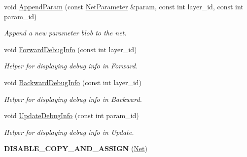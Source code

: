 \begin{DoxyCompactItemize}
\mbox{\label{classcaffe_1_1_net_a1fce7e829c10750543f3a79819d49393}} 
void \mbox{\hyperlink{classcaffe_1_1_net_a1fce7e829c10750543f3a79819d49393}{Append\+Param}} (const \mbox{\hyperlink{classcaffe_1_1_net_parameter}{Net\+Parameter}} \&param, const int layer\+\_\+id, const int param\+\_\+id)
\begin{DoxyCompactList}\small\item\em Append a new parameter blob to the net. \end{DoxyCompactList}\item 
\mbox{\label{classcaffe_1_1_net_a3751d6095c3d4f4384c52ad80bbd0d88}} 
void \mbox{\hyperlink{classcaffe_1_1_net_a3751d6095c3d4f4384c52ad80bbd0d88}{Forward\+Debug\+Info}} (const int layer\+\_\+id)
\begin{DoxyCompactList}\small\item\em Helper for displaying debug info in Forward. \end{DoxyCompactList}\item 
\mbox{\label{classcaffe_1_1_net_a0ddec52928f0488e1b1136a0d72db0a1}} 
void \mbox{\hyperlink{classcaffe_1_1_net_a0ddec52928f0488e1b1136a0d72db0a1}{Backward\+Debug\+Info}} (const int layer\+\_\+id)
\begin{DoxyCompactList}\small\item\em Helper for displaying debug info in Backward. \end{DoxyCompactList}\item 
\mbox{\label{classcaffe_1_1_net_a93a439c92c9218f1dfff16f76d617faa}} 
void \mbox{\hyperlink{classcaffe_1_1_net_a93a439c92c9218f1dfff16f76d617faa}{Update\+Debug\+Info}} (const int param\+\_\+id)
\begin{DoxyCompactList}\small\item\em Helper for displaying debug info in Update. \end{DoxyCompactList}\item 
\mbox{\label{classcaffe_1_1_net_a3d52b2d075fa543e687cf61ba035a488}} 
{\bfseries D\+I\+S\+A\+B\+L\+E\+\_\+\+C\+O\+P\+Y\+\_\+\+A\+N\+D\+\_\+\+A\+S\+S\+I\+GN} (\mbox{\hyperlink{classcaffe_1_1_net}{Net}})
\end{DoxyCompactItemize}
